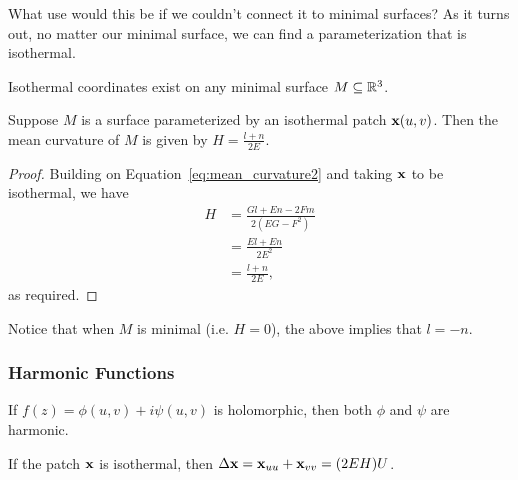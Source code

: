     What use would this be if we couldn't connect it to minimal surfaces? As it turns out, no matter our minimal surface, we can find a parameterization that is isothermal.

    \begin{thm}
      Isothermal coordinates exist on any minimal surface $M \subseteq \mathbb{R}^3$.
    \end{thm}

    \begin{lem}
      Suppose $M$ is a surface parameterized by an isothermal patch $\mathbf{x}(u, v)$. Then the mean curvature of $M$ is given by $H = \frac{l + n}{2E}$.
    \end{lem}
    \begin{proof}
      Building on Equation~\ref{eq:mean_curvature2} and taking $\mathbf{x}$ to be isothermal, we have
      \begin{align*}
        H &= \frac{Gl + En - 2Fm}{2(EG - F^2)}\\
        &= \frac{El + En}{2E^2}\\
        &= \frac{l + n}{2E},
      \end{align*}
      as required.
    \end{proof}

    \begin{unno_rem}
      Notice that when $M$ is minimal (i.e. $H = 0$), the above implies that $l = -n$.
    \end{unno_rem}

  \subsubsection{Harmonic Functions}


    \begin{thm}
      \label{thm:harmonic}
      If $f(z) = \phi(u, v) + i\psi(u, v)$ is holomorphic, then both $\phi$ and $\psi$ are harmonic.
    \end{thm}


    \begin{thm}
      \label{thm:deltaxehu}
      If the patch $\mathbf{x}$ is isothermal, then $\Delta\mathbf{x} = \mathbf{x}_{uu} + \mathbf{x}_{vv} = (2EH)U$.
    \end{thm}
      
